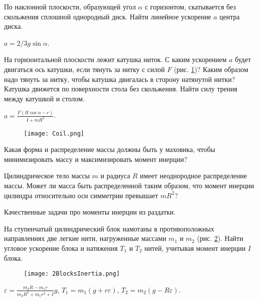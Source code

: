 \begin{ex} %
По наклонной плоскости, образующей угол $\alpha$ с горизонтом, скатывается без скольжения сплошной однородный диск. Найти линейное ускорение $a$ центра диска.
\begin{ans}
$a=2/3g\sin \alpha$.
\end{ans}
\end{ex}	

\begin{ex} %
На горизонтальной плоскости лежит катушка ниток. С каким ускорением $a$ будет двигаться ось катушки, если тянуть за нитку с силой $F$ (рис. \ref{Coil})? Каким образом	надо тянуть за нитку, чтобы катушка двигалась в сторону натянутой нитки? Катушка движется по поверхности стола без скольжения. Найти силу трения между катушкой и столом.
\begin{ans}
$a = \frac{F(R\cos \alpha - r)}{I + mR^2}$.
\end{ans}
\end{ex}	

\begin{figure}
\centering
\texttt{[image: Coil.png]}
\caption{}
\label{Coil}
\end{figure}

\qualProblems

\begin{ex}
Какая форма и распределение массы должны быть у маховика, чтобы минимизировать массу и максимизировать момент инерции?
\end{ex}	

\begin{ex}
Цилиндрическое тело массы $m$ и радиуса $R$ имеет неоднородное распределение массы. Может ли масса быть распределенной таким образом, что момент инерции цилиндра относительно оси симметрии превышает $mR^2$? 
\end{ex}	

Качественные задачи про моменты инерции из раздатки.
\complexProblems

\begin{ex} %
На ступенчатый цилиндрический блок намотаны в противоположных направлениях две легкие нити, нагруженные массами $m_1$ и $m_2$ (рис. \ref{2BlocksInertia}). Найти угловое ускорение блока и натяжения $T_1$ и $T_2$ нитей, учитывая момент инерции $I$ блока.

\begin{figure}[h]
\centering
\texttt{[image: 2BlocksInertia.png]}
\caption{}
\label{2BlocksInertia}
\end{figure}

\begin{ans}
$\varepsilon = \frac{m_2R - m_1r}{m_2R^2 + m_1r^2 + I}g$, $T_1 = m_1(g+r\varepsilon)$, $T_2 = m_2(g-R\varepsilon)$.
\end{ans}
\end{ex}	

